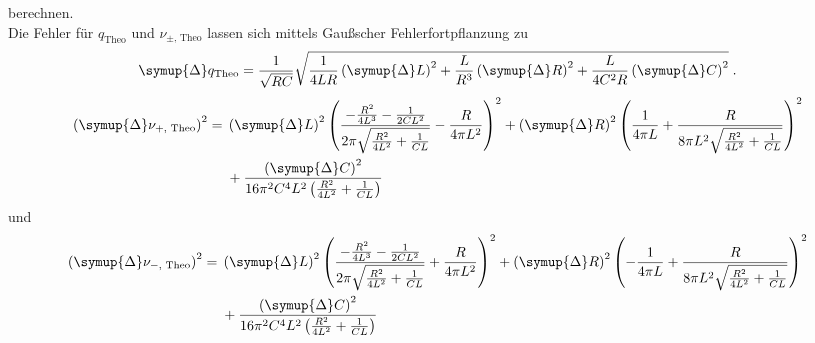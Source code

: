 berechnen.\\
Die Fehler für $q_\text{Theo}$ und $\nu_{\pm\text{, Theo}}$ lassen sich mittels Gaußscher Fehlerfortpflanzung zu
\begin{equation}
    \symup{\Delta} q_\text{Theo} = \frac{1}{\sqrt{RC}} \sqrt{\frac{1}{4LR} \left ( \symup{\Delta} L \right )^2 + \frac{L}{R^3} \left ( \symup{\Delta} R \right )^2 
    + \frac{L}{4C^2R} \left ( \symup{\Delta} C \right )^2} \; \text{.}
\end{equation}
\begin{equation}
    \begin{split}
    \left ( \symup{\Delta} \nu_{+\text{, Theo}} \right )^2= {} & \left ( \symup{\Delta} L \right)^{2} \left(\frac{- \frac{R^{2}}{4 L^{3}} - \frac{1}{2 C L^{2}}}{2 \pi \sqrt{\frac{R^{2}}{4 L^{2}} + \frac{1}{C L}}} - \frac{R}{4 \pi L^{2}}\right)^{2} + \left ( \symup{\Delta} R \right)^{2} \left(\frac{1}{4 \pi L} + \frac{R}{8 \pi L^{2} \sqrt{\frac{R^{2}}{4 L^{2}} + \frac{1}{C L}}}\right)^{2} \\
    & + \frac{\left ( \symup{\Delta} C \right)^{2}}{16 \pi^{2} C^{4} L^{2} \left(\frac{R^{2}}{4L^{2}} + \frac{1}{C L}\right)}
    \end{split}
\end{equation}
und 
\begin{equation}
    \begin{split}
    \left ( \symup{\Delta} \nu_{-\text{, Theo}} \right )^2= {} & \left ( \symup{\Delta} L \right)^{2} \left(\frac{- \frac{R^{2}}{4 L^{3}} - \frac{1}{2 C L^{2}}}{2 \pi \sqrt{\frac{R^{2}}{4 L^{2}} + \frac{1}{C L}}} + \frac{R}{4 \pi L^{2}}\right)^{2} + \left ( \symup{\Delta} R \right)^{2} \left(- \frac{1}{4 \pi L} + \frac{R}{8 \pi L^{2} \sqrt{\frac{R^{2}}{4 L^{2}} + \frac{1}{C L}}}\right)^{2} \\
    & + \frac{\left ( \symup{\Delta} C \right)^{2}}{16 \pi^{2} C^{4} L^{2} \left(\frac{R^{2}}{4 L^{2}} + \frac{1}{C L}\right)}
    \end{split}
\end{equation}